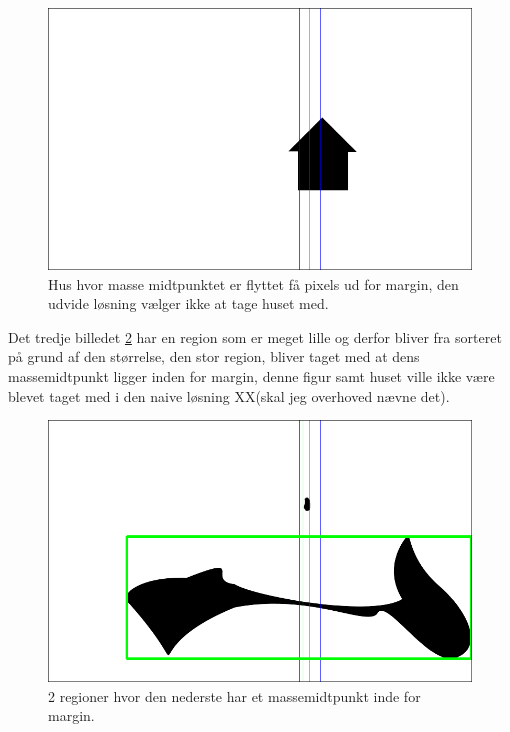 \begin{figure}[h!!]
	\begin{center}
		\includegraphics[scale=0.3,angle=0]{afsnit/afprovning/billeder/udvidet_losning/udvidet_hus2_test.png}
	\end{center}
	\caption[]{Hus hvor masse midtpunktet er flyttet få pixels ud for margin, den udvide løsning vælger ikke at tage huset med.}
	\label{hus_virker_ikke}
\end{figure}

Det tredje billedet \ref{udvidet_blob_test} har en region som er meget lille
og derfor bliver fra sorteret på grund af den størrelse, den stor
region, bliver taget med at dens massemidtpunkt ligger inden for margin,
denne figur samt huset ville ikke være blevet taget med i den naive
løsning XX(skal jeg overhoved nævne det). 

\begin{figure}[h!!]
	\begin{center}
		\includegraphics[scale=0.3,angle=0]{afsnit/afprovning/billeder/udvidet_losning/udvidet_blob2_test.png}
	\end{center}
	\caption[]{2 regioner hvor den nederste har et massemidtpunkt inde for margin.}
	\label{udvidet_blob_test}
\end{figure}

